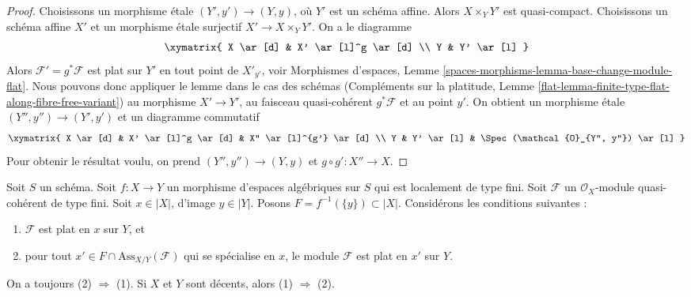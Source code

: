 \begin{proof}
Choisissons un morphisme \'etale $(Y', y') \to (Y, y)$, où $Y'$ est un
schéma affine. Alors $X \times_Y Y'$ est quasi-compact.
Choisissons un schéma affine $X'$ et un morphisme \'etale surjectif
$X' \to X \times_Y Y'$. On a le diagramme
$$
\xymatrix{
X \ar[d] & X' \ar[l]^g \ar[d] \\
Y & Y' \ar[l]
}
$$
Alors $\mathcal{F}' = g^*\mathcal{F}$ est plat sur $Y'$ en tout
point de $X'_{y'}$, voir Morphismes d'espaces, Lemme
\ref{spaces-morphisms-lemma-base-change-module-flat}.
Nous pouvons donc appliquer le lemme dans le cas des schémas
(Compléments sur la platitude, Lemme
\ref{flat-lemma-finite-type-flat-along-fibre-free-variant})
au morphisme
$X' \to Y'$, au faisceau quasi-cohérent $g^*\mathcal{F}$ et au point $y'$.
On obtient un morphisme \'etale $(Y'', y'') \to (Y', y')$ et un
diagramme commutatif
$$
\xymatrix{
X \ar[d] & X' \ar[l]^g \ar[d] & X'' \ar[l]^{g'} \ar[d] \\
Y & Y' \ar[l] & \Spec(\mathcal{O}_{Y'', y''}) \ar[l]
}
$$
Pour obtenir le résultat voulu, on prend $(Y'', y'') \to (Y, y)$
et $g \circ g' : X'' \to X$.
\end{proof}

\begin{theorem}
\label{theorem-check-flatness-at-associated-points}
Soit $S$ un schéma.
Soit $f : X \to Y$ un morphisme d'espaces algébriques sur $S$
qui est localement de type fini.
Soit $\mathcal{F}$ un $\mathcal{O}_X$-module quasi-cohérent de type fini.
Soit $x \in |X|$, d'image $y \in |Y|$.
Posons $F = f^{-1}(\{y\}) \subset |X|$.
Considérons les conditions suivantes :
\begin{enumerate}
\item $\mathcal{F}$ est plat en $x$ sur $Y$, et
\item pour tout $x' \in F \cap \text{Ass}_{X/Y}(\mathcal{F})$ qui
se spécialise en $x$, le module $\mathcal{F}$ est plat en $x'$ sur $Y$.
\end{enumerate}
On a toujours (2) $\Rightarrow$ (1). Si $X$ et $Y$ sont
décents, alors (1) $\Rightarrow$ (2).
\end{theorem}

